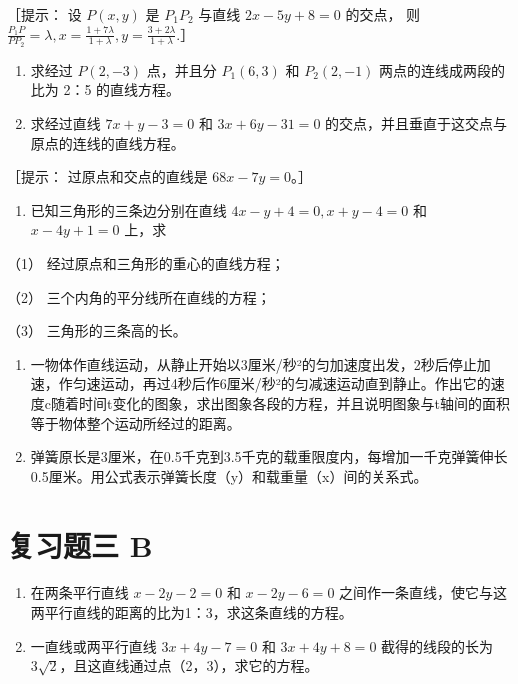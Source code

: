 ［提示： 设 \(P(x, y)\) 是 \(P_{1}P_{2}\) 与直线 \(2x - 5y + 8 = 0\)
的交点， 则
\(\frac{P_{1}P}{PP_{2}} = \lambda, x = \frac{1 + 7\lambda}{1 + \lambda}, y = \frac{3 + 2\lambda}{1 + \lambda}\).］

\begin{enumerate}
\def\labelenumi{\arabic{enumi}.}
\setcounter{enumi}{9}
\item
  求经过 \(P(2, -3)\) 点，并且分 \(P_{1}(6, 3)\) 和 \(P_{2}(2, -1)\)
  两点的连线成两段的比为 2：5 的直线方程。
\item
  求经过直线 \(7x + y - 3 = 0\) 和 \(3x + 6y - 31 = 0\)
  的交点，并且垂直于这交点与原点的连线的直线方程。
\end{enumerate}

［提示： 过原点和交点的直线是 \(68x - 7y = 0\)。］

\begin{enumerate}
\def\labelenumi{\arabic{enumi}.}
\setcounter{enumi}{11}
\tightlist
\item
  已知三角形的三条边分别在直线 \(4x - y + 4 = 0, x + y - 4 = 0\) 和
  \(x - 4y + 1 = 0\) 上，求
\end{enumerate}

（1） 经过原点和三角形的重心的直线方程；

（2） 三个内角的平分线所在直线的方程；

（3） 三角形的三条高的长。

\begin{enumerate}
\def\labelenumi{\arabic{enumi}.}
\setcounter{enumi}{12}
\item
  一物体作直线运动，从静止开始以3厘米/秒²的匀加速度出发，2秒后停止加速，作匀速运动，再过4秒后作6厘米/秒²的匀减速运动直到静止。作出它的速度c随着时间t变化的图象，求出图象各段的方程，并且说明图象与t轴间的面积等于物体整个运动所经过的距离。
\item
  弹簧原长是3厘米，在0.5千克到3.5千克的载重限度内，每增加一千克弹簧伸长0.5厘米。用公式表示弹簧长度（y）和载重量（x）间的关系式。
\end{enumerate}

\section{复习题三 B}\label{ux590dux4e60ux9898ux4e09-b}

\begin{enumerate}
\def\labelenumi{\arabic{enumi}.}
\item
  在两条平行直线 \(x - 2y - 2 = 0\) 和 \(x - 2y - 6 = 0\)
  之间作一条直线，使它与这两平行直线的距离的比为1：3，求这条直线的方程。
\item
  一直线或两平行直线 \(3x + 4y - 7 = 0\) 和 \(3x + 4y + 8 = 0\)
  截得的线段的长为 \(3\sqrt{2}\)，且这直线通过点（2，3），求它的方程。
\end{enumerate}

